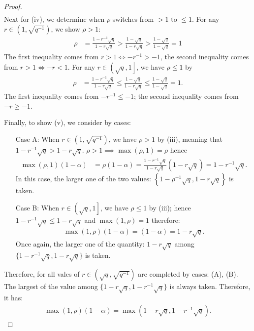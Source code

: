 \documentclass[12pt]{article}
\begin{document}
\begin{proof}
\begin{align*}
        \end{align*}
        Next for (iv), we determine when $\rho$ switches from $> 1$ to $ \le 1$. 
        For any $r \in \left(1, \sqrt{q^{-1}}\right)$, we show $\rho > 1$: 
        \begin{align*}
            \rho &= \frac{1 - r^{-1}\sqrt{q}}{1 - r \sqrt{q}} 
            > \frac{1 - \sqrt{q}}{1 - r \sqrt{q}} > \frac{1 - \sqrt{q}}{1 - \sqrt{q}} = 1
        \end{align*}
        The first inequality comes from $r > 1 \iff -r^{-1} > -1$, the second inequality comes from $r > 1 \iff -r < 1$. 
        For any $r \in \left(\sqrt{q}, 1\right]$, we have $\rho \le 1$ by 
        \begin{align*}
            \rho &= \frac{1 - r^{-1}\sqrt{q}}{1 - r \sqrt{q}} 
            \le \frac{1 - \sqrt{q}}{1 - r \sqrt{q}} \le \frac{1 - \sqrt{q}}{1 - \sqrt{q}} = 1. 
        \end{align*}
        The first inequality comes from $-r^{-1} \le - 1$; the second inequality comes from $-r \ge -1$. 
        \par
        Finally, to show (v), we consider by cases: 
        \begin{enumerate}
            \item[Case A:] When $r \in \left(1, \sqrt{q^{-1}}\right)$, we have $\rho > 1$ by (iii), meaning that $1 - r^{-1}\sqrt{q} > 1 - r \sqrt{q}$. $\rho > 1 \implies \max(\rho, 1) = \rho$ hence 
                \begin{align*}
                    \max(\rho, 1)(1 - \alpha) &= \rho(1- \alpha)
                    = \frac{1 - r^{-1}\sqrt{q}}{1 - r \sqrt{q}}(1 - r \sqrt{q}) = 1 - r^{-1}\sqrt{q}. 
                \end{align*}
                In this case, the larger one of the two values: $\left\lbrace1 - \rho^{-1}\sqrt{q}, 1 - r\sqrt{q}\right\rbrace$ is taken. 
            \item[Case B:] When $r \in \left(\sqrt{q}, 1\right]$, we have $\rho \le 1$ by (iii); hence $1 - r^{-1}\sqrt{q} \le 1 - r \sqrt{q}$ and $\max(1,\rho) = 1$ therefore: 
            \begin{align*}
                \max(1, \rho)(1 - \alpha) = (1 - \alpha) = 1 - r \sqrt{q}. 
            \end{align*}
            Once again, the larger one of the quantity: $1 - r \sqrt{q}$ among $\{1 - r^{-1}\sqrt{q}, 1 - r\sqrt{q}\}$ is taken. 
        \end{enumerate}
        Therefore, for all vales of $r \in \left(\sqrt{q}, \sqrt{q^{-1}}\right)$ are completed by cases: (A), (B).
        The largest of the value among $\{1 - r \sqrt{q}, 1 - r^{-1}\sqrt{q}\}$ is always taken. 
        Therefore, it has: 
        \begin{align*}
            \max(1, \rho)(1 - \alpha) = \max\left(1 - r\sqrt{q}, 1 - r^{-1}\sqrt{q}\right). 
        \end{align*}

    \end{proof}
\end{document}
